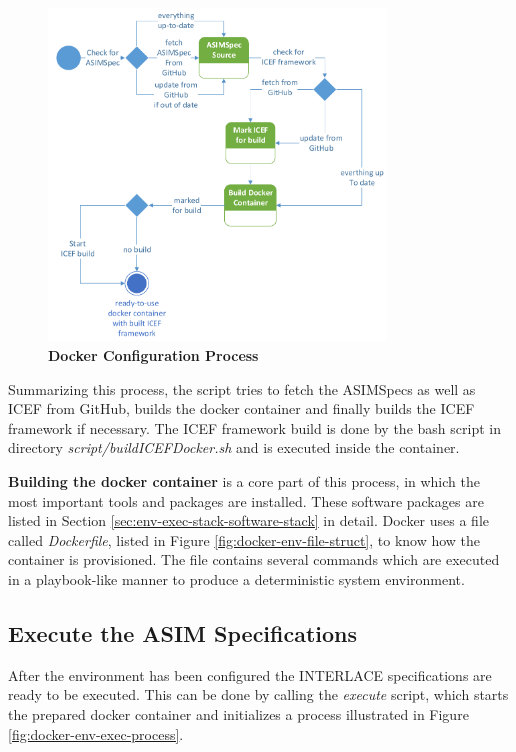 \begin{figure}[H]
  \centering
  \includegraphics[width=0.8\textwidth, clip, trim=1mm 1mm 1mm 1mm]{Figures/docker_configure}
  \caption{\bf\small Docker Configuration Process}
  \label{fig:docker-env-config-process}
\end{figure}

Summarizing this process, the script tries to fetch the ASIMSpecs as well as ICEF from GitHub, builds the docker container and finally builds the ICEF framework if necessary. The ICEF framework build is done by the bash script in directory \textit{script/buildICEFDocker.sh} and is executed inside the container.

\textbf{Building the docker container} is a core part of this process, in which the most important tools and packages are installed. These software packages are listed in Section \ref{sec:env-exec-stack-software-stack} in detail. Docker uses a file called \textit{Dockerfile}, listed in Figure \ref{fig:docker-env-file-struct}, to know how the container is provisioned. The file contains several commands which are executed in a playbook-like manner to produce a deterministic system environment.

\subsection{Execute the ASIM Specifications}

After the environment has been configured the INTERLACE specifications are ready to be executed. This can be done by calling the \textit{execute} script, which starts the prepared docker container and initializes a process illustrated in Figure \ref{fig:docker-env-exec-process}.

